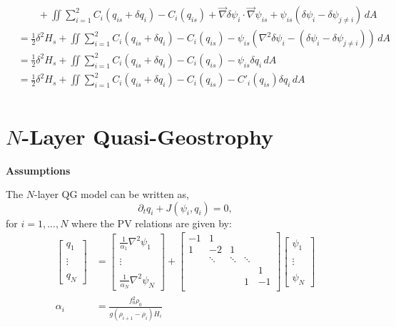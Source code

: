 \documentclass[12pt]{article}
\begin{document}
\begin{align*}
      &\quad\quad + \iint \sum_{i=1}^2 C_i(q_{is} + \delta q_i) - C_i(q_{is}) + \vec\nabla\delta\psi_i \cdot \vec\nabla\psi_{is} + \psi_{is}(\delta\psi_i - \delta\psi_{j \ne i}) \, dA \\
      &= \frac12 \delta^2 H_s + \iint \sum_{i=1}^2 C_i(q_{is} + \delta q_i) - C_i(q_{is}) - \psi_{is}(\nabla^2\delta\psi_i - (\delta\psi_i - \delta\psi_{j \ne i})) \, dA \\
      &= \frac12 \delta^2 H_s + \iint \sum_{i=1}^2 C_i(q_{is} + \delta q_i) - C_i(q_{is}) - \psi_{is}\delta q_i \, dA \\
      &= \frac12 \delta^2 H_s + \iint \sum_{i=1}^2 C_i(q_{is} + \delta q_i) - C_i(q_{is}) - C'_i(q_{is})\delta q_i \, dA \\
    \end{align*}


\section{$N$-Layer Quasi-Geostrophy}

  \textbf{Assumptions}

  The $N$-layer QG model can be written as,
  $$
  \partial_t q_i + J(\psi_i, q_i) = 0,
  $$
  for $i=1,...,N$ where the PV relations are given by:
  \begin{align*}
    \left[\begin{array}{c}
      q_1 \\
      \\
      \vdots \\
      \\
      q_N
    \end{array}\right]
    &=
    \left[\begin{array}{c}
      \frac{1}{\alpha_1}\nabla^2 \psi_1 \\
      \\
      \vdots \\
      \\
      \frac{1}{\alpha_N}\nabla^2 \psi_N
    \end{array}\right]
    +
    \left[\begin{array}{ccccc}
      -1 & 1 & & & \\
      1 & -2 & 1 & & \\
       & \ddots & \ddots & \ddots & \\
       & & & & 1 \\
       & & & 1 & -1\\
    \end{array}\right]
    \left[\begin{array}{c}
      \psi_1 \\
      \\
      \vdots \\
      \\
      \psi_N
    \end{array}\right] \\
    \alpha_i &= \frac{f_0^2 \rho_0}{g (\rho_{i+1} - \rho_i) H_i}
  \end{align*}
\end{document}
